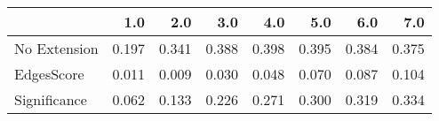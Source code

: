 \begin{tabular}{lrrrrrrr}
\toprule
{} &   1.0 &   2.0 &   3.0 &   4.0 &   5.0 &   6.0 &   7.0 \\
\midrule
No Extension & 0.197 & 0.341 & 0.388 & 0.398 & 0.395 & 0.384 & 0.375 \\
EdgesScore   & 0.011 & 0.009 & 0.030 & 0.048 & 0.070 & 0.087 & 0.104 \\
Significance & 0.062 & 0.133 & 0.226 & 0.271 & 0.300 & 0.319 & 0.334 \\
\bottomrule
\end{tabular}
